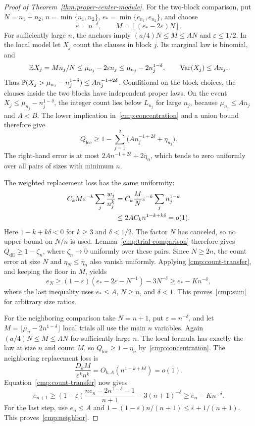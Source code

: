 \begin{proof}[Proof of Theorem~\ref{thm:proper-center-module}]
For the two-block comparison, put
$N=n_1+n_2$, $n=\min\{n_1,n_2\}$,
$e_* =\min\{e_{n_1},e_{n_2}\}$, and choose
\[
 \varepsilon=n^{-\delta},\qquad
 M=\left\lfloor(e_*-2\varepsilon)N\right\rfloor.
\]
For sufficiently large $n$, the anchors imply
$(a/4)N\le M\le AN$ and $\varepsilon\le1/2$.
In the local model let $X_j$ count the clauses in block $j$.  Its marginal
law is binomial, and
\[
 \mathbb E X_j=Mn_j/N\le\mu_{n_j}-2\varepsilon n_j
       \le\mu_{n_j}-2n_j^{1-\delta},\qquad
 \operatorname{Var}(X_j)\le A n_j.
\]
Thus
$\mathbb P(X_j>\mu_{n_j}-n_j^{1-\delta})\le A n_j^{-1+2\delta}$.
Conditional on the block choices, the clauses inside the two blocks have
independent proper laws.  On the event
$X_j\le\mu_{n_j}-n_j^{1-\delta}$, the integer count lies below $L_{n_j}$
for large $n_j$, because $\mu_{n_j}\le A n_j$ and $A<B$.
The lower implication in~\eqref{cmp:concentration} and a union bound
therefore give
\[
 Q_{\mathrm{loc}}\ge1-
 \sum_{j=1}^{2}\bigl(A n_j^{-1+2\delta}+\eta_{n_j}\bigr).
\]
The right-hand error is at most
$2A n^{-1+2\delta}+2\overline\eta_n$, which tends to zero uniformly
over all pairs of sizes with minimum $n$.

The weighted replacement loss has the same uniformity:
\begin{align}
 C_kM\varepsilon^{-k}\sum_j\frac{w_j}{n_j^k}
 &=C_k\frac{M}{N}\varepsilon^{-k}\sum_jn_j^{1-k}\notag\\
 &\le2AC_k n^{1-k+k\delta}=o(1).
 \label{cmp:uniform-replacement-loss}
\end{align}
Here $1-k+k\delta<0$ for $k\ge3$ and $\delta<1/2$.
The factor $N$ has canceled, so no upper bound on $N/n$ is used.
Lemma~\ref{cmp:trial-comparison} therefore gives
$Q_{\mathrm{dil}}\ge1-\zeta_n$, where $\zeta_n\to0$ uniformly over
these pairs.  Since $N\ge2n$, the count error at size $N$ and
$\eta_N\le\overline\eta_n$ also vanish uniformly.  Applying
\eqref{cmp:count-transfer}, and keeping the floor in $M$, yields
\[
 e_N\ge(1-\varepsilon)(e_*-2\varepsilon-N^{-1})-3N^{-\delta}
       \ge e_*-K n^{-\delta},
\]
where the last inequality uses $e_*\le A$, $N\ge n$, and $\delta<1$.
This proves~\eqref{cmp:sum} for arbitrary size ratios.

For the neighboring comparison take $N=n+1$, put
$\varepsilon=n^{-\delta}$, and let
$M=\lfloor\mu_n-2n^{1-\delta}\rfloor$ local trials all use the main
$n$ variables.  Again $(a/4)N\le M\le AN$ for sufficiently large $n$.
The local formula has exactly the law at size $n$ and count $M$, so
$Q_{\mathrm{loc}}\ge1-\eta_n$ by~\eqref{cmp:concentration}.
The neighboring replacement loss is
\[
 \frac{D_kM}{\varepsilon^k n^k}=O_{k,A}(n^{1-k+k\delta})=o(1).
\]
Equation~\eqref{cmp:count-transfer} now gives
\[
 e_{n+1}\ge(1-\varepsilon)
       \frac{ne_n-2n^{1-\delta}-1}{n+1}-3(n+1)^{-\delta}
       \ge e_n-Kn^{-\delta}.
\]
For the last step, use $e_n\le A$ and
$1-(1-\varepsilon)n/(n+1)\le\varepsilon+1/(n+1)$.
This proves~\eqref{cmp:neighbor}.


\end{proof}
